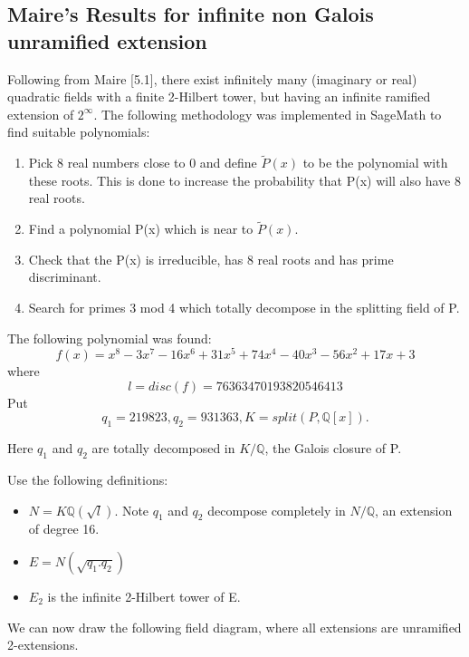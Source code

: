 \documentclass[12pt]{extarticle}
\newcommand{\Q}{\mathbb{Q}}
\newcommand{\<}{\langle}
\renewcommand{\>}{\rangle}
\theoremstyle{definition}
\begin{document}
\subsection{Maire's Results for infinite non Galois unramified extension}
Following from Maire \cite{MAIR}[5.1], there exist infinitely many (imaginary or real) quadratic fields with a finite 2-Hilbert tower, but having an infinite ramified extension of $2^{\infty{}}$. 
The following methodology was implemented in SageMath to find suitable polynomials:
\begin{enumerate}
    \item Pick 8 real numbers close to 0 and define $\tilde{P}(x)$ to be the polynomial with these roots. This is done to increase the probability that P(x) will also have 8 real roots. 
    \item Find a polynomial P(x) which is near to $\tilde{P}(x)$.
    \item Check that the P(x) is irreducible, has 8 real roots and has prime discriminant. 
    \item Search for primes 3 mod 4 which totally decompose in the splitting field of P. 
\end{enumerate}
The following polynomial was found: 
\begin{equation}
    f(x) = x^8 - 3x^7 - 16x^6 + 31x^5 + 74x^4 - 40x^3 - 56x^2 + 17x + 3
\end{equation}
where 
\begin{equation}
    l = disc(f) = 76363470193820546413
\end{equation}
Put \begin{equation}
    q_1 = 219823, q_2 = 931363, K = split(P, \Q[x]).
\end{equation}
\par
Here $q_1$ and  $q_2$ are totally decomposed in $K/\Q$, the Galois closure of P.
\par
Use the following definitions: 
\begin{itemize}
    \item $N = K\Q(\sqrt{l})$. Note $q_1$ and $q_2$ decompose completely in $N/\Q$, an extension of degree 16.
    \item $E = N(\sqrt{q_1.q_2})$
    \item $E_2$ is the infinite 2-Hilbert tower of E.
\end{itemize}
\par 
We can now draw the following field diagram, where all extensions are unramified 2-extensions. 
\end{document}
